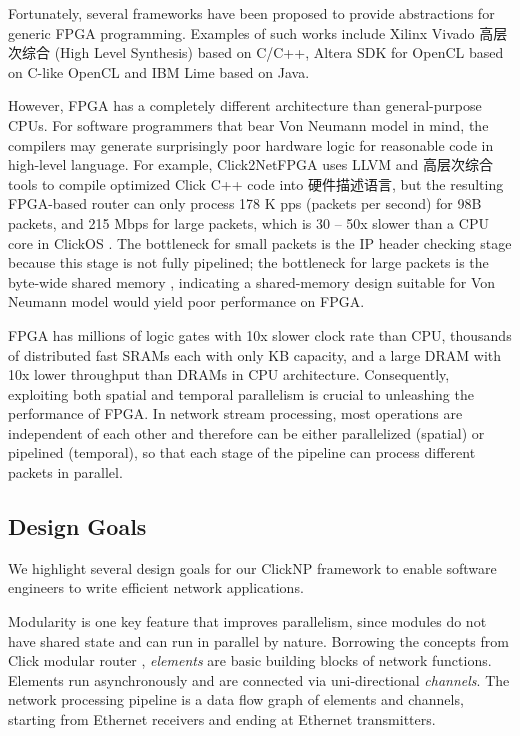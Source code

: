 {Fortunately, several frameworks have been proposed to provide abstractions for generic FPGA programming. Examples of such works include Xilinx Vivado 高层次综合 (High Level Synthesis) \cite{feist2012vivado} based on C/C++, Altera SDK for OpenCL \cite{czajkowski2012opencl} based on C-like OpenCL and IBM Lime \cite{auerbach2010lime} based on Java.

However, FPGA has a completely different architecture than general-purpose CPUs. For software programmers that bear Von Neumann model in mind, the compilers may generate surprisingly poor hardware logic for reasonable code in high-level language. For example, Click2NetFPGA \cite{Click2NetFPGA} uses LLVM and 高层次综合 tools to compile optimized Click C++ code into 硬件描述语言, but the resulting FPGA-based router can only process 178 K pps (packets per second) for 98B packets, and 215 Mbps for large packets, which is 30 -- 50x slower than a CPU core in ClickOS \cite{martins2014clickos}. The bottleneck for small packets is the IP header checking stage \cite{Click2NetFPGA} because this stage is not fully pipelined; the bottleneck for large packets is the byte-wide shared memory \cite{Click2NetFPGA}, indicating a shared-memory design suitable for Von Neumann model would yield poor performance on FPGA.

FPGA has millions of logic gates with 10x slower clock rate than CPU, thousands of distributed fast SRAMs each with only KB capacity, and a large DRAM with 10x lower throughput than DRAMs in CPU architecture. Consequently, exploiting both spatial and temporal parallelism is crucial to unleashing the performance of FPGA. In network stream processing, most operations are independent of each other and therefore can be either parallelized (spatial) or pipelined (temporal), so that each stage of the pipeline can process different packets in parallel.

\subsection{Design Goals}
\label{clicknp:subsec:designgoals}

We highlight several design goals for our ClickNP framework to enable software engineers to write efficient network applications.

 Modularity is one key feature that improves parallelism, since modules do not have shared state and can run in parallel by nature. Borrowing the concepts from Click modular router \cite{kohler2000click}, \textit{elements} are basic building blocks of network functions. Elements run asynchronously and are connected via uni-directional \textit{channels}. The network processing pipeline is a data flow graph of elements and channels, starting from Ethernet receivers and ending at Ethernet transmitters.

}
